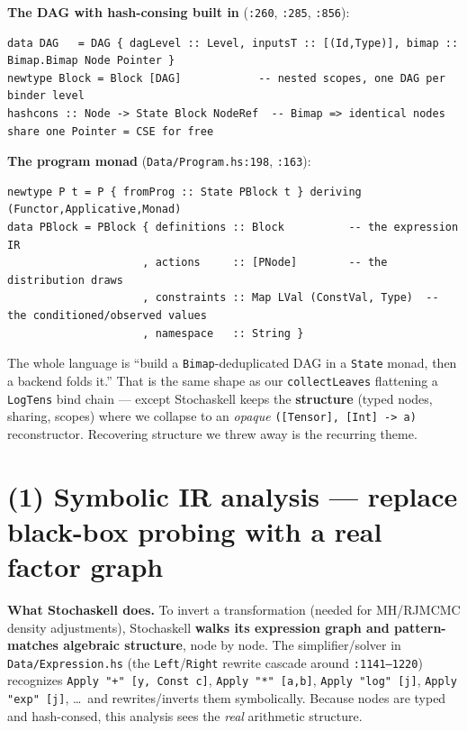 \documentclass[11pt]{article}
\newcommand{\code}[1]{\texttt{#1}}
\begin{document}
\textbf{The DAG with hash-consing built in} (\code{:260}, \code{:285}, \code{:856}):

\begin{lstlisting}
data DAG   = DAG { dagLevel :: Level, inputsT :: [(Id,Type)], bimap :: Bimap.Bimap Node Pointer }
newtype Block = Block [DAG]            -- nested scopes, one DAG per binder level
hashcons :: Node -> State Block NodeRef  -- Bimap => identical nodes share one Pointer = CSE for free
\end{lstlisting}

\textbf{The program monad} (\code{Data/Program.hs:198}, \code{:163}):

\begin{lstlisting}
newtype P t = P { fromProg :: State PBlock t } deriving (Functor,Applicative,Monad)
data PBlock = PBlock { definitions :: Block          -- the expression IR
                     , actions     :: [PNode]        -- the distribution draws
                     , constraints :: Map LVal (ConstVal, Type)  -- the conditioned/observed values
                     , namespace   :: String }
\end{lstlisting}

The whole language is ``build a \code{Bimap}-deduplicated DAG in a \code{State} monad, then a backend
folds it.'' That is the same shape as our \code{collectLeaves} flattening a \code{LogTens} bind chain
--- except Stochaskell keeps the \textbf{structure} (typed nodes, sharing, scopes) where we collapse
to an \emph{opaque} \code{([Tensor], [Int] -> a)} reconstructor. Recovering structure we threw away is
the recurring theme.

\section*{(1) Symbolic IR analysis --- replace black-box probing with a real factor graph}

\textbf{What Stochaskell does.} To invert a transformation (needed for MH/RJMCMC density adjustments),
Stochaskell \textbf{walks its expression graph and pattern-matches algebraic structure}, node by node.
The simplifier/solver in \code{Data/Expression.hs} (the \code{Left}/\code{Right} rewrite cascade around
\code{:1141--1220}) recognizes \code{Apply "+" [y, Const c]}, \code{Apply "*" [a,b]},
\code{Apply "log" [j]}, \code{Apply "exp" [j]}, \dots\ and rewrites/inverts them symbolically. Because
nodes are typed and hash-consed, this analysis sees the \emph{real} arithmetic structure.
\end{document}
